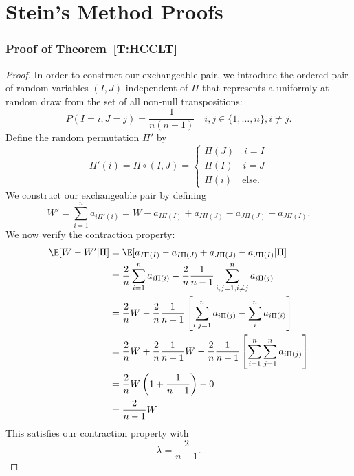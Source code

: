 \chapter{Stein's Method Proofs}
\label{A:steins-method-app}
\subsection{Proof of Theorem~\ref{T:HCCLT}}

\begin{proof}
  In order to construct our exchangeable pair, we introduce the
  ordered pair of random variables $(I, J)$ independent of $\Pi$ that
  represents a uniformly at random draw from the set of all non-null
  transpositions:
  \begin{equation}
    P(I = i, J = j) = \frac{1}{n(n-1)} \quad i, j \in \{1, \ldots, n\}, i \neq j.
  \end{equation}
  Define the random permutation $\Pi'$ by
  \begin{equation}
    \Pi'(i) = \Pi \circ (I, J) =
    \begin{cases}
      \Pi(J) \quad i = I \\
      \Pi(I) \quad i = J \\
      \Pi(i) \quad \text{else}.
    \end{cases}
  \end{equation}
  We construct our exchangeable pair by defining
  \begin{equation}
    W' = \sum_{i=1}^n a_{i\Pi'(i)} = W
    - a_{I \Pi(I)} + a_{I \Pi(J)} - a_{J \Pi(J)} + a_{J \Pi(I)}.
  \end{equation}
  We now verify the contraction property:
  \begin{align*}
    \E[W - W' | \Pi] &=
    \E[a_{I \Pi(I)} - a_{I \Pi(J)} + a_{J \Pi(J)} - a_{J \Pi(I)} | \Pi] \\
    & = \frac{2}{n}\sum_{i=1}^n a_{i\Pi(i)} -
    \frac{2}{n}\frac{1}{n-1}\sum_{i,j=1, i \neq j}^n a_{i\Pi(j)} \\
    &= \frac{2}{n} W -
    \frac{2}{n}\frac{1}{n-1}
    \left [
      \sum_{i,j=1}^n a_{i\Pi(j)} - \sum_{i}^n a_{i\Pi(i)}
    \right ] \\
    &= \frac{2}{n} W + \frac{2}{n}\frac{1}{n-1}W -
    \frac{2}{n}\frac{1}{n-1}
    \left [
      \sum_{i=1}^n \sum_{j=1}^n a_{i\Pi(j)}
    \right ] \\
    &= \frac{2}{n} W \left (1 + \frac{1}{n-1} \right ) - 0 \\
    &= \frac{2}{n-1} W
  \end{align*}
  This satisfies our contraction property with
  \begin{equation}
    \lambda = \frac{2}{n-1}.
  \end{equation}


\end{proof}
